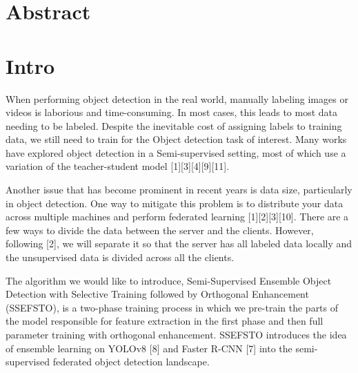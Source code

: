 \section {Abstract}
\section{Intro}
When performing object detection in the real world, manually labeling images or videos is laborious and time-consuming. In most cases, this leads to most data needing to be labeled. Despite the inevitable cost of assigning labels to training data, we still need to train for the Object detection task of interest. Many works have explored object detection in a Semi-supervised setting, most of which use a variation of the teacher-student model  [1][3][4][9][11].

Another issue that has become prominent in recent years is data size, particularly in object detection. One way to mitigate this problem is to distribute your data across multiple machines and perform federated learning [1][2][3][10]. There are a few ways to divide the data between the server and the clients. However, following [2], we will separate it so that the server has all labeled data locally and the unsupervised data is divided across all the clients.

The algorithm we would like to introduce, Semi-Supervised Ensemble Object Detection with Selective Training followed by Orthogonal Enhancement (SSEFSTO), is a two-phase training process in which we pre-train the parts of the model responsible for feature extraction in the first phase and then full parameter training with orthogonal enhancement. SSEFSTO introduces the idea of ensemble learning on  YOLOv8 [8] and  Faster R-CNN [7] into the semi-supervised federated object detection landscape.

